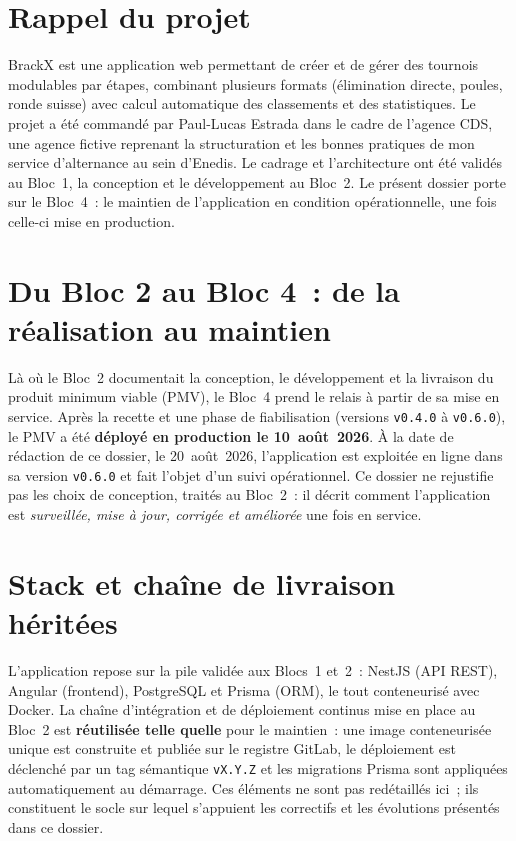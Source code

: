 \section*{Rappel du projet}
BrackX est une application web permettant de créer et de gérer des tournois modulables par étapes, combinant plusieurs formats (élimination directe, poules, ronde suisse) avec calcul automatique des classements et des statistiques. Le projet a été commandé par Paul-Lucas Estrada dans le cadre de l'agence CDS, une agence fictive reprenant la structuration et les bonnes pratiques de mon service d'alternance au sein d'Enedis. Le cadrage et l'architecture ont été validés au Bloc~1, la conception et le développement au Bloc~2. Le présent dossier porte sur le Bloc~4~: le maintien de l'application en condition opérationnelle, une fois celle-ci mise en production.

\section*{Du Bloc 2 au Bloc 4~: de la réalisation au maintien}
Là où le Bloc~2 documentait la conception, le développement et la livraison du produit minimum viable (PMV), le Bloc~4 prend le relais à partir de sa mise en service. Après la recette et une phase de fiabilisation (versions \texttt{v0.4.0} à \texttt{v0.6.0}), le PMV a été \textbf{déployé en production le 10~août~2026}. À la date de rédaction de ce dossier, le 20~août~2026, l'application est exploitée en ligne dans sa version \texttt{v0.6.0} et fait l'objet d'un suivi opérationnel. Ce dossier ne rejustifie pas les choix de conception, traités au Bloc~2~: il décrit comment l'application est \emph{surveillée, mise à jour, corrigée et améliorée} une fois en service.

\section*{Stack et chaîne de livraison héritées}
L'application repose sur la pile validée aux Blocs~1 et~2~: NestJS (API REST), Angular (frontend), PostgreSQL et Prisma (ORM), le tout conteneurisé avec Docker. La chaîne d'intégration et de déploiement continus mise en place au Bloc~2 est \textbf{réutilisée telle quelle} pour le maintien~: une image conteneurisée unique est construite et publiée sur le registre GitLab, le déploiement est déclenché par un tag sémantique \texttt{vX.Y.Z} et les migrations Prisma sont appliquées automatiquement au démarrage. Ces éléments ne sont pas redétaillés ici~; ils constituent le socle sur lequel s'appuient les correctifs et les évolutions présentés dans ce dossier.

